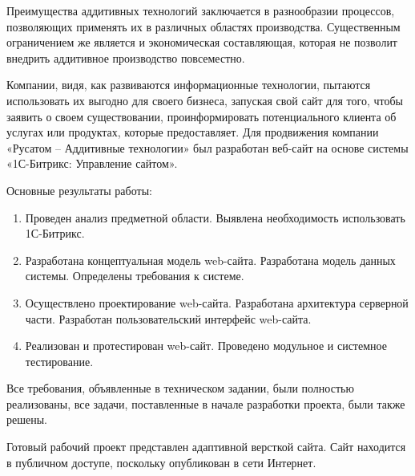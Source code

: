 \newsection
{}

Преимущества аддитивных технологий заключается в разнообразии процессов, позволяющих применять их в различных областях производства. Существенным ограничением же является и экономическая составляющая, которая не позволит внедрить аддитивное производство повсеместно.
  
Компании, видя, как развиваются информационные технологии, пытаются использовать их выгодно для своего бизнеса, запуская свой сайт для того, чтобы заявить о своем существовании, проинформировать потенциального клиента об услугах или продуктах, которые предоставляет. 
Для продвижения компании «Русатом – Аддитивные технологии» был разработан веб-сайт на основе системы «1С-Битрикс: Управление сайтом».

Основные результаты работы:

\begin{enumerate}
\item Проведен анализ предметной области. Выявлена необходимость использовать 1С-Битрикс.
\item Разработана концептуальная модель web-сайта. Разработана модель данных системы. Определены требования к системе.
\item Осуществлено проектирование web-сайта. Разработана архитектура серверной части. Разработан пользовательский интерфейс web-сайта.
\item Реализован и протестирован web-сайт. Проведено модульное и системное тестирование.
\end{enumerate}

Все требования, объявленные в техническом задании, были полностью реализованы, все задачи, поставленные в начале разработки проекта, были также решены.

Готовый рабочий проект представлен адаптивной версткой сайта. Сайт находится в публичном доступе, поскольку опубликован в сети Интернет.  

